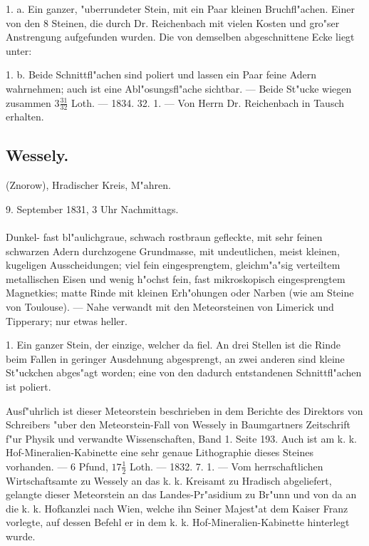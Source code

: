 \documentclass[a4paper, 11pt, oneside, polutonikogreek, german]{article}
\begin{document}
1. a. Ein ganzer, "uberrundeter Stein, mit ein Paar kleinen Bruchfl"achen. Einer von den 8 Steinen, die durch Dr. Reichenbach mit vielen Kosten und gro"ser Anstrengung aufgefunden wurden. Die von demselben abgeschnittene Ecke liegt unter:

1. b. Beide Schnittfl"achen sind poliert und lassen ein Paar feine Adern wahrnehmen; auch ist eine Abl"osungsfl"ache sichtbar. --- Beide St"ucke wiegen zusammen $3\frac{31}{32}$ Loth. --- 1834. 32. 1. --- Von Herrn Dr. Reichenbach in Tausch erhalten.
\subsection{Wessely.}
\begin{center}
\small
(Znorow), Hradischer Kreis, M"ahren.

9. September 1831, 3 Uhr Nachmittags.
\end{center}
\paragraph{}
Dunkel- fast bl"aulichgraue, schwach rostbraun gefleckte, mit sehr feinen schwarzen Adern durchzogene Grundmasse, mit undeutlichen, meist kleinen, kugeligen Ausscheidungen; viel fein eingesprengtem, gleichm"a"sig verteiltem metallischen Eisen und wenig h"ochst fein, fast mikroskopisch eingesprengtem Magnetkies; matte Rinde mit kleinen Erh"ohungen oder Narben (wie am Steine von Toulouse). --- Nahe verwandt mit den Meteorsteinen von Limerick und Tipperary; nur etwas heller.

1. Ein ganzer Stein, der einzige, welcher da fiel. An drei Stellen ist die Rinde beim Fallen in geringer Ausdehnung abgesprengt, an zwei anderen sind kleine St"uckchen abges"agt worden; eine von den dadurch entstandenen Schnittfl"achen ist poliert.

Ausf"uhrlich ist dieser Meteorstein beschrieben in dem Berichte des Direktors von Schreibers "uber den Meteorstein-Fall von Wessely in Baumgartners Zeitschrift f"ur Physik und verwandte Wissenschaften, Band 1. Seite 193. Auch ist am k. k. Hof-Mineralien-Kabinette eine sehr genaue Lithographie dieses Steines vorhanden. --- 6 Pfund, $17\frac{1}{2}$ Loth. --- 1832. 7. 1. --- Vom herrschaftlichen Wirtschaftsamte zu Wessely an das k. k. Kreisamt zu Hradisch abgeliefert, gelangte dieser Meteorstein an das Landes-Pr"asidium zu Br"unn und von da an die k. k. Hofkanzlei nach Wien, welche ihn Seiner Majest"at dem Kaiser Franz vorlegte, auf dessen Befehl er in dem k. k. Hof-Mineralien-Kabinette hinterlegt wurde.
\end{document}
